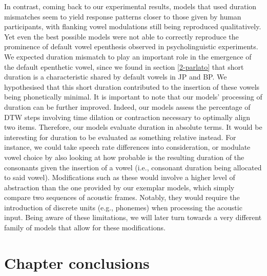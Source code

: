 In contrast, coming back to our experimental results, models that used duration mismatches seem to yield response patterns closer to those given by human participants, with flanking vowel modulations still being reproduced qualitatively. Yet even the best possible models were not able to correctly reproduce the prominence of default vowel epenthesis observed in psycholinguistic experiments. We expected duration mismatch to play an important role in the emergence of the default epenthetic vowel, since we found in section \ref{2-parlato} that short duration is a characteristic shared by default vowels in JP and BP. We hypothesised that this short duration contributed to the insertion of these vowels being phonetically minimal.
It is important to note that our models' processing of duration can be further improved. Indeed, our models assess the percentage of DTW steps involving time dilation or contraction necessary to optimally align two items. Therefore, our models evaluate duration in absolute terms. It would be interesting for duration to be evaluated as something relative instead. For instance, we could take speech rate differences into consideration, or modulate vowel choice by also looking at how probable is the resulting duration of the consonants given the insertion of a vowel (i.e., consonant duration being allocated to said vowel). Modifications such as these would involve a higher level of abstraction than the one provided by our exemplar models, which simply compare two sequences of acoustic frames. Notably, they would require the introduction of discrete units (e.g., phonemes) when processing the acoustic input. Being aware of these limitations, we will later turn towards a very different family of models that allow for these modifications.

\section{Chapter conclusions}


